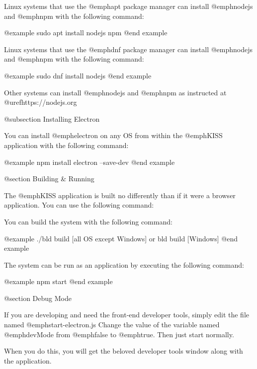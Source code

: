 Linux systems that use the @emph{apt} package manager can install  @emph{nodejs} and @emph{npm} with the following command: 

@example
sudo apt install nodejs npm
@end example

Linux systems that use the @emph{dnf} package manager can install  @emph{nodejs} and @emph{npm} with the following command: 

@example
sudo dnf install nodejs
@end example

Other systems can install  @emph{nodejs} and @emph{npm} as instructed at
@uref{https://nodejs.org}

@subsection Installing Electron

You can install @emph{electron} on any OS from within the @emph{KISS} application with the following command:

@example
npm install electron --save-dev
@end example

@section Building & Running

The @emph{KISS} application is built no differently than if it were a browser application.  You can use the following command:

You can build the system with the following command:

@example
./bld build              [all OS except Windows]
    or
bld build                [Windows]
@end example

The system can be run as an application by executing the following command:

@example
npm start
@end example

@section Debug Mode

If you are developing and need the front-end developer tools, simply edit the file named @emph{start-electron.js}
Change the value of the variable named @emph{devMode} from @emph{false} to @emph{true}.  Then just start normally.

When you do this, you will get the beloved developer tools window along with the application.
